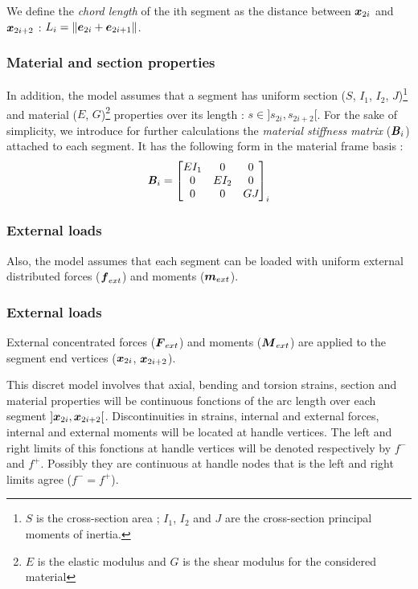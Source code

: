 We define the \emph{chord length} of the ith segment as the distance between $\boldsymbol{x}_{2i}$ and $\boldsymbol{x}_{2i+2}$ : $L_i = \lVert\boldsymbol{e}_{2i} + \boldsymbol{e}_{2i+1}\rVert$.

\subsubsection{Material and section properties}

In addition, the model assumes that a segment has uniform section ($S$, $I_1$, $I_2$, $J$)\footnote{$S$ is the cross-section area ; $I_1$, $I_2$ and $J$ are the cross-section principal moments of inertia.} and material ($E$, $G$)\footnote{$E$ is the elastic modulus and $G$ is the shear  modulus for the considered material} properties over its length : $s \in ]s_{2i},s_{2i+2}[$. For the sake of simplicity, we introduce for further calculations the \emph{material stiffness matrix} ($\boldsymbol{\mathit{B}}_i$) attached to each segment. It has the following form in the material frame basis :
\begin{equation}
	\boldsymbol{\mathit{B}}_i = \begin{bmatrix} 
			EI_1		&	0		&	0		\\
			0		&	EI_{2}	&	0		\\
			0		&	0		&	GJ_{}	\\
		\end{bmatrix}_i
\end{equation}
 

\subsubsection{External loads}

Also, the model assumes that each segment can be loaded with uniform external distributed forces ($\boldsymbol{f}_{ext}$) and moments ($\boldsymbol{m}_{ext}$).





\subsubsection{External loads}

External concentrated forces ($\boldsymbol{F}_{ext}$) and moments ($\boldsymbol{M}_{ext}$) are applied to the segment end vertices ($\boldsymbol{x}_{2i}$,  $\boldsymbol{x}_{2i+2}$).

This discret model involves that axial, bending and torsion strains, section and material properties will be continuous fonctions of the arc length over each segment $]\boldsymbol{x}_{2i},  \boldsymbol{x}_{2i+2}[$. Discontinuities in strains, internal and external forces, internal and external moments will be located at handle vertices. The left and right limits of this fonctions at handle vertices will be denoted respectively by $f^-$ and $f^+$. Possibly they are continuous at handle nodes that is the left and right limits agree ($f^- = f^+$).

